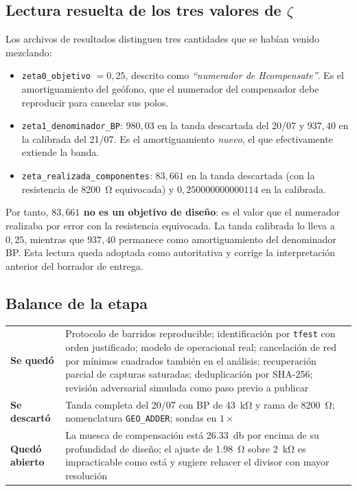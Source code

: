 \subsection{Lectura resuelta de los tres valores de \texorpdfstring{$\zeta$}{zeta}}

Los archivos de resultados distinguen tres cantidades que se hab\'ian venido
mezclando:
\begin{itemize}[itemsep=0.15em,topsep=0.2em]
\item \texttt{zeta0\_objetivo} $= 0{,}25$, descrito como \emph{``numerador de
Hcompensate''}. Es el amortiguamiento del ge\'ofono, que el numerador del
compensador debe reproducir para cancelar sus polos.
\item \texttt{zeta1\_denominador\_BP}: $980{,}03$ en la tanda descartada del
20/07 y $937{,}40$ en la calibrada del 21/07. Es el amortiguamiento
\emph{nuevo}, el que efectivamente extiende la banda.
\item \texttt{zeta\_realizada\_componentes}: \textbf{$83{,}661$} en la tanda
descartada (con la resistencia de \SI{8200}{\ohm} equivocada) y
\textbf{$0{,}250000000000114$} en la calibrada.
\end{itemize}
Por tanto, \textbf{$83{,}661$ no es un objetivo de dise\~no}: es el valor que
el numerador realizaba por error con la resistencia equivocada. La tanda
calibrada lo lleva a $0{,}25$, mientras que $937{,}40$ permanece como
amortiguamiento del denominador BP. Esta lectura queda adoptada como
autoritativa y corrige la interpretaci\'on anterior del borrador de entrega.

\subsection{Balance de la etapa}

\begin{center}\small
\begin{tabularx}{\textwidth}{@{}l X@{}}
\toprule
\textbf{Se qued\'o} & Protocolo de barridos reproducible; identificaci\'on por \texttt{tfest} con orden justificado; modelo de operacional real; cancelaci\'on de red por m\'inimos cuadrados tambi\'en en el an\'alisis; recuperaci\'on parcial de capturas saturadas; deduplicaci\'on por SHA-256; revisi\'on adversarial simulada como paso previo a publicar \\
\addlinespace[3pt]
\textbf{Se descart\'o} & Tanda completa del 20/07 con BP de \SI{43}{\kilo\ohm} y rama de \SI{8200}{\ohm}; nomenclatura \texttt{GEO\_ADDER}; sondas en $1\times$ \\
\addlinespace[3pt]
\textbf{Qued\'o abierto} & La muesca de compensaci\'on est\'a \SI{26.33}{\decibel} por encima de su profundidad de dise\~no; el ajuste de \SI{1.98}{\ohm} sobre \SI{2}{\kilo\ohm} es impracticable como est\'a y sugiere rehacer el divisor con mayor resoluci\'on \\
\bottomrule
\end{tabularx}
\end{center}
